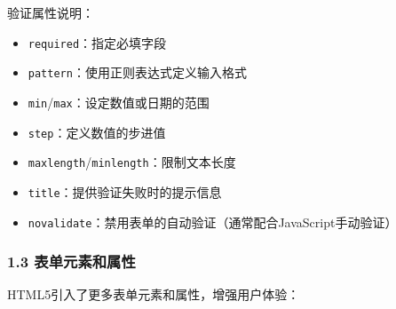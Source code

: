 验证属性说明：

\begin{itemize}
\tightlist
\item
  \passthrough{\lstinline!required!}：指定必填字段
\item
  \passthrough{\lstinline!pattern!}：使用正则表达式定义输入格式
\item
  \passthrough{\lstinline!min!}/\passthrough{\lstinline!max!}：设定数值或日期的范围
\item
  \passthrough{\lstinline!step!}：定义数值的步进值
\item
  \passthrough{\lstinline!maxlength!}/\passthrough{\lstinline!minlength!}：限制文本长度
\item
  \passthrough{\lstinline!title!}：提供验证失败时的提示信息
\item
  \passthrough{\lstinline!novalidate!}：禁用表单的自动验证（通常配合JavaScript手动验证）
\end{itemize}

\subsubsection{1.3
表单元素和属性}\label{ux8868ux5355ux5143ux7d20ux548cux5c5eux6027}

HTML5引入了更多表单元素和属性，增强用户体验：

